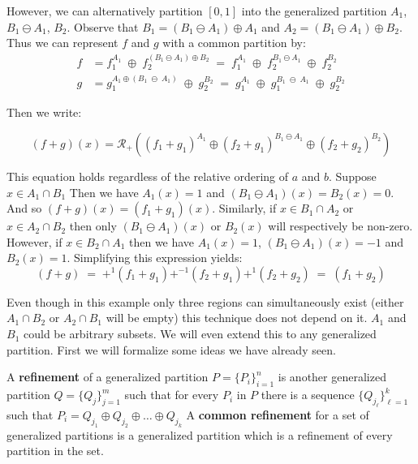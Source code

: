 However, we can alternatively partition $[0,1]$ into the generalized partition $A_1$, $B_1 \ominus A_1$, $B_2$.
Observe that $B_1 = (B_1 \ominus A_1) \oplus A_1$ and $A_2 = (B_1 \ominus A_1) \oplus B_2$.
Thus we can represent $f$ and $g$ with a common partition by:
\begin{align}
	f &=  f_1^{A_1} \;\oplus\; f_2^{(B_1 \ominus A_1) \oplus B_2}
		\;=\; f_1^{A_1} \;\oplus\; f_2^{B_1 \ominus A_1} \;\oplus\; f_2^{B_2} \\
	g &= g_1^{A_1 \oplus (B_1 \;\ominus\; A_1)} \;\oplus\; g_2^{B_2}
		\;=\; g_1^{A_1} \;\oplus\; g_1^{B_1 \;\ominus\; A_1} \;\oplus\; g_2^{B_2}
\end{align}

Then we write:

\begin{equation}
	(f+g)(x) = \mathcal{R}_+ \left( (f_1 + g_1)^{A_1} 
			\oplus (f_2 + g_1)^{B_1 \ominus A_1} 
			\oplus (f_2 + g_2)^{B_2} \right)
\end{equation}

This equation holds regardless of the relative ordering of $a$ and $b$.
Suppose $x \in A_1 \cap B_1$
Then we have $A_1(x)= 1$ and $(B_1 \ominus A_1)(x) = B_2(x) = 0$.
And so $(f+g)(x) = (f_1 + g_1)(x)$.
Similarly, if $x \in B_1 \cap A_2$ or $x \in A_2 \cap B_2$ then 
only $(B_1 \ominus A_1)(x)$ or $B_2(x)$ will respectively be non-zero.
However, if $x \in B_2 \cap A_1$ then we have $A_1(x) = 1$, $(B_1 \ominus A_1)(x) = -1$ and $B_2(x) = 1$.
Simplifying this expression yields:
\begin{equation}
	(f+g) \;=\; +^1 (f_1 + g_1) +^{-1} (f_2 + g_1) +^1 (f_2 + g_2) \;=\; (f_1 + g_2)
\end{equation}


Even though in this example only three regions can simultaneously exist 
(either $A_1 \cap B_2$ or $A_2 \cap B_1$ will be empty)
 this technique does not depend on it.
$A_1$ and $B_1$ could be arbitrary subsets.
We will even extend this to any generalized partition.
First we will formalize some ideas we have already seen.

\begin{definition}
	A \textbf{refinement} of a generalized partition $P = \{P_i\}_{i=1}^n$ is another generalized partition
	$Q = \{Q_j \}_{j=1}^m$ such that for every $P_i$ in $P$ there is a sequence
	$\{ Q_{j_\ell} \}_{\ell=1}^k$ such that $P_i = Q_{j_1} \oplus Q_{j_2} \oplus \ldots \oplus Q_{j_k}$
	A \textbf{common refinement} for a set of generalized partitions is a generalized partition which is a 
	refinement of every partition in the set. 
\end{definition}


